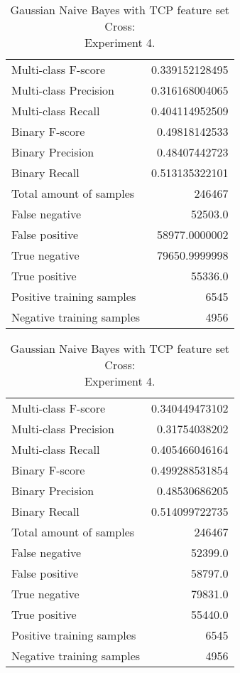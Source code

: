 \begin{table}[H]
\begin{minipage}{0.5\textwidth}
\caption{Gaussian Naive Bayes with TCP feature set Cross: \\Experiment 3.}
\centering
\begin{tabular}{l r}
\toprule
Multi-class F-score & 0.339152128495 \\
Multi-class Precision & 0.316168004065 \\
Multi-class Recall & 0.404114952509 \\
\midrule
Binary F-score & 0.49818142533 \\
Binary Precision & 0.48407442723 \\
Binary Recall & 0.513135322101 \\
\midrule
Total amount of samples & 246467 \\
False negative & 52503.0 \\
False positive & 58977.0000002 \\
True negative & 79650.9999998 \\
True positive & 55336.0 \\
\midrule
Positive training samples & 6545 \\
Negative training samples & 4956 \\
\bottomrule
\end{tabular}
\end{minipage}
\hfillx
\begin{minipage}{0.5\textwidth}
\caption{Gaussian Naive Bayes with TCP feature set Cross: \\Experiment 4.}
\centering
\begin{tabular}{l r}
\toprule
Multi-class F-score & 0.340449473102 \\
Multi-class Precision & 0.31754038202 \\
Multi-class Recall & 0.405466046164 \\
\midrule
Binary F-score & 0.499288531854 \\
Binary Precision & 0.48530686205 \\
Binary Recall & 0.514099722735 \\
\midrule
Total amount of samples & 246467 \\
False negative & 52399.0 \\
False positive & 58797.0 \\
True negative & 79831.0 \\
True positive & 55440.0 \\
\midrule
Positive training samples & 6545 \\
Negative training samples & 4956 \\
\bottomrule
\end{tabular}
\end{minipage}
\end{table}
